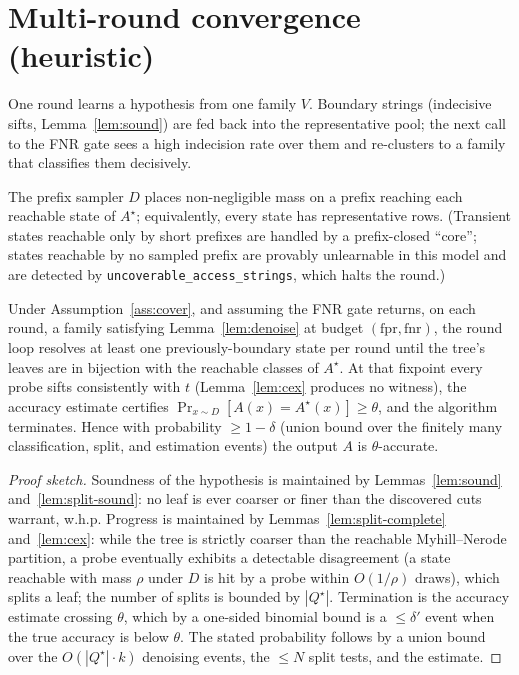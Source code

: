 \section{Multi-round convergence (heuristic)}

One round learns a hypothesis from one family $V$. Boundary strings (indecisive
sifts, Lemma~\ref{lem:sound}) are fed back into the representative pool; the next
call to the FNR gate sees a high indecision rate over them and re-clusters to a
family that classifies them decisively.

\begin{assumption}[Coverage]\label{ass:cover}
The prefix sampler $D$ places non-negligible mass on a prefix reaching each
reachable state of $A^\star$; equivalently, every state has representative
rows. (Transient states reachable only by short prefixes are handled by a
prefix-closed ``core''; states reachable by no sampled prefix are provably
unlearnable in this model and are detected by
\texttt{uncoverable\_access\_strings}, which halts the round.)
\end{assumption}

\begin{theorem}\label{thm:main}
Under Assumption~\ref{ass:cover}, and assuming the FNR gate returns, on each round,
a family satisfying Lemma~\ref{lem:denoise} at budget $(\mathrm{fpr},\mathrm{fnr})$,
the round loop resolves at least one previously-boundary state per round until the
tree's leaves are in bijection with the reachable classes of $A^\star$. At that
fixpoint every probe sifts consistently with $t$
(Lemma~\ref{lem:cex} produces no witness), the accuracy estimate certifies
$\Pr_{x\sim D}[A(x)=A^\star(x)]\ge\theta$, and the algorithm terminates. Hence with
probability $\ge 1-\delta$ (union bound over the finitely many
classification, split, and estimation events) the output $A$ is $\theta$-accurate.
\end{theorem}

\begin{proof}[Proof sketch]
Soundness of the hypothesis is maintained by Lemmas~\ref{lem:sound}
and~\ref{lem:split-sound}: no leaf is ever coarser or finer than the discovered
cuts warrant, w.h.p. Progress is maintained by
Lemmas~\ref{lem:split-complete} and~\ref{lem:cex}: while the tree is strictly
coarser than the reachable Myhill--Nerode partition, a probe eventually exhibits a
detectable disagreement (a state reachable with mass $\rho$ under $D$ is hit by a
probe within $O(1/\rho)$ draws), which splits a leaf; the number of splits is
bounded by $|Q^\star|$. Termination is the accuracy estimate crossing $\theta$,
which by a one-sided binomial bound is a $\le\delta'$ event when the true accuracy
is below $\theta$. The stated probability follows by a union bound over the
$O(|Q^\star|\cdot k)$ denoising events, the $\le N$ split tests, and the estimate.
\end{proof}
